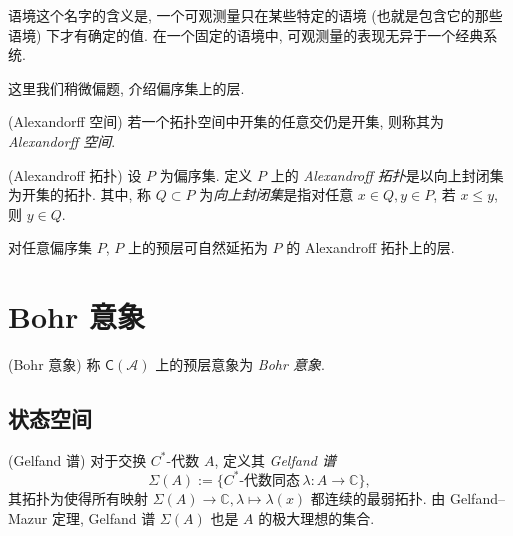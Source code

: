 \begin{remark}
    {}
    语境这个名字的含义是, 一个可观测量只在某些特定的语境 (也就是包含它的那些语境) 下才有确定的值. 在一个固定的语境中, 可观测量的表现无异于一个经典系统.
\end{remark}

这里我们稍微偏题, 介绍偏序集上的层.

\begin{definition}
    {(Alexandorff 空间)}
    若一个拓扑空间中开集的任意交仍是开集, 则称其为 \emph{Alexandorff 空间}.
\end{definition}

\begin{definition}
    {(Alexandroff 拓扑)}
    设 $P$ 为偏序集. 定义 $P$ 上的 \emph{Alexandroff 拓扑}是以向上封闭集为开集的拓扑. 其中, 称 $Q\subset P$ 为\emph{向上封闭集}是指对任意 $x\in Q,y\in P$, 若 $x\leq y$, 则 $y\in Q$.
\end{definition}

\begin{prop}
    {}
    对任意偏序集 $P$, $P$ 上的预层可自然延拓为 $P$ 的 Alexandroff 拓扑上的层.
\end{prop}

%

\section{Bohr 意象}

\begin{definition}
    {(Bohr 意象)}
    称 $\mathsf C(\mathcal A)$ 上的预层意象为 \emph{Bohr 意象}.
\end{definition}



\subsection{状态空间}

\begin{definition}
    {(Gelfand 谱)}
    对于交换 $C^*$-代数 $A$, 定义其 \emph{Gelfand 谱}
$$
\Sigma(A) := \{C^*\text{-代数同态}\,\lambda\colon A \to\mathbb{C}\},
$$
其拓扑为使得所有映射 $\Sigma(A)\to\mathbb{C}, \lambda \mapsto \lambda (x)$ 都连续的最弱拓扑. 由 Gelfand--Mazur 定理, Gelfand 谱 $\Sigma(A)$ 也是 $A$ 的极大理想的集合.
\end{definition}

